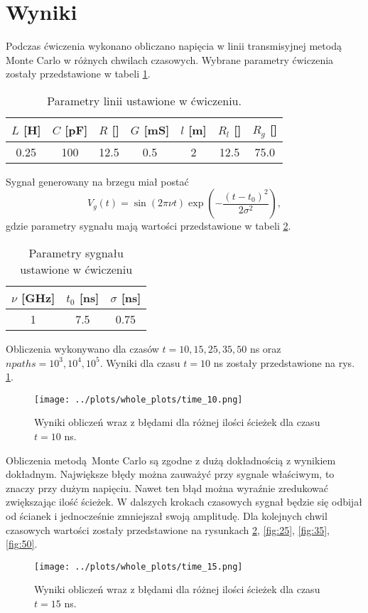 \documentclass[a4paper, 12pt]{article}
\begin{document}
	\section*{Wyniki}
	
	Podczas ćwiczenia wykonano obliczano napięcia w linii transmisyjnej metodą Monte Carlo w różnych chwilach czasowych. 
	Wybrane parametry ćwiczenia zostały przedstawione w tabeli \ref{tab1}.
	\begin{table}[H]
		\centering
		\caption{Parametry linii ustawione w ćwiczeniu.}
		\label{tab1}
		\begin{tabular}{|c|c|c|c|c|c|c|}
			\hline
			$L$ [\textmu H] &  $C$ [pF] & $R$ [\textohm] & $G$ [mS] & $l$ [m] & $R_l$ [\textohm] & $R_g$ [\textohm] \\  
			\hline
			0.25 & 100 & 12.5 & 0.5 & 2 & 12.5 & 75.0 \\
			\hline
		\end{tabular}
	\end{table}
	
	\noaka Sygnał generowany na brzegu miał postać
	\begin{equation}
		V_g(t) = \sin(2\pi \nu t) \exp(-\frac{(t-t_0)^2}{2\sigma^2}),
	\end{equation}
	gdzie parametry sygnału mają wartości przedstawione w tabeli \ref{tab2}.
	\begin{table}[H]
		\centering
		\caption{Parametry sygnału ustawione w ćwiczeniu}
		\label{tab2}
		\begin{tabular}{|c|c|c|}
			\hline
			$\nu$ [GHz]  &  $t_0$ [ns] & $\sigma$ [ns] \\ \hline
			1 & 7.5 & 0.75 \\
			\hline
		\end{tabular}
	\end{table}
	
	\noindent Obliczenia wykonywano dla czasów $t = 10,15,25,35,50$ ns oraz $npaths = 10^3,10^4,10^5$.
	Wyniki dla czasu $t = 10$ ns zostały przedstawione na rys. \ref{fig:10}.
	\begin{figure}[H]
		\centering
		\texttt{[image: ../plots/whole\_plots/time\_10.png]}
		\caption{Wyniki obliczeń wraz z błędami dla różnej ilości ścieżek dla czasu $t = 10$ ns.}
		\label{fig:10}
	\end{figure}
	
	\noindent Obliczenia metodą Monte Carlo są zgodne z dużą dokładnością z wynikiem dokładnym. 
	Największe błędy można zauważyć przy sygnale właściwym, to znaczy przy dużym napięciu.
	Nawet ten błąd można wyraźnie zredukować zwiększając ilość ścieżek. 
	W dalszych krokach czasowych sygnał będzie się odbijał od ścianek i jednocześnie zmniejszał swoją amplitudę. 
	Dla kolejnych chwil czasowych wartości zostały przedstawione na rysunkach \ref{fig:15}, \ref{fig:25}, \ref{fig:35}, \ref{fig:50}.
	\begin{figure}[H]
		\centering
		\texttt{[image: ../plots/whole\_plots/time\_15.png]}
		\caption{Wyniki obliczeń wraz z błędami dla różnej ilości ścieżek dla czasu $t = 15$ ns.}
		\label{fig:15}
	\end{figure}
	
\end{document}
